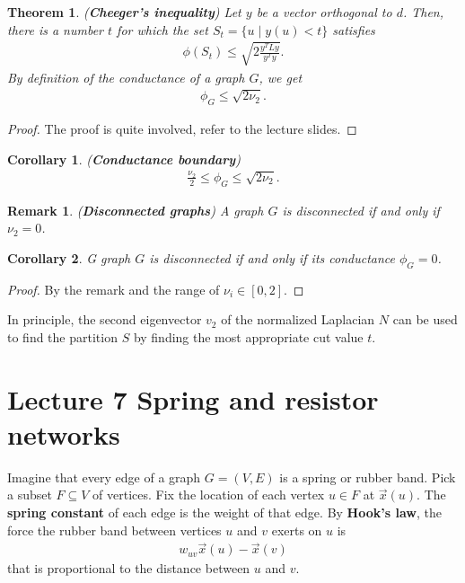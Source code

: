 \documentclass[]{article}
\newtheorem{theorem}{Theorem}[section]
\newtheorem{remark}{Remark}[section]
\newtheorem{corollary}{Corollary}[section]
\begin{document}
	\begin{theorem} (\textbf{Cheeger's inequality})
		Let $y$ be a vector orthogonal to $d$. Then, there is a number $t$ for which the set $S_t = \{u \mid y(u) < t\}$ satisfies 
		\begin{align*}
		\phi(S_t) \le \sqrt{2\frac{y^T L y}{y^T y}}.
		\end{align*}
		By definition of the conductance of a graph $G$, we get 
		\begin{align*}
		\phi_G \le \sqrt{2\nu_2}.
		\end{align*}
	\end{theorem}
	\begin{proof}
		The proof is quite involved, refer to the lecture slides. 
	\end{proof}
	
	\begin{corollary} (\textbf{Conductance boundary})
		\begin{align*}
		\frac{\nu_2}{2} \le \phi_G \le \sqrt{2\nu_2}.
		\end{align*}
	\end{corollary}
	\begin{remark} (\textbf{Disconnected graphs})
		A graph $G$ is disconnected if and only if $\nu_2=0$.
	\end{remark}
	
	\begin{corollary}
		G graph $G$ is disconnected if and only if its conductance $\phi_G=0$.
	\end{corollary}
	\begin{proof}
		By the remark and the range of $\nu_i \in [0,2]$.
	\end{proof}
	
	In principle, the second eigenvector $v_2$ of the normalized Laplacian $N$ can be used to find the partition $S$ by finding the most appropriate cut value $t$. 
	
	\section{Lecture 7 Spring and resistor networks}
	
	Imagine that every edge of a graph $G=(V,E)$ is a spring or rubber band. Pick a subset $F \subseteq V$ of vertices. Fix the location of each vertex $u \in F$ at $\vec{x}(u)$. The \textbf{spring constant} of each edge is the weight of that edge. By \textbf{Hook's law}, the force the rubber band between vertices $u$ and $v$ exerts on $u$ is 
	\begin{align*}
	w_{uv}\vec{x}(u) - \vec{x}(v)
	\end{align*}
	that is proportional to the distance between $u$ and $v$.
	
\end{document}
